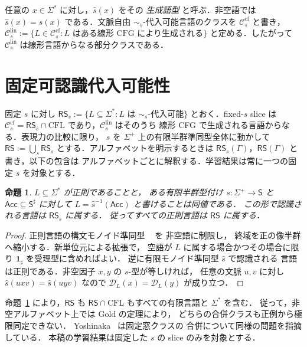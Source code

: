 \documentclass[11pt,a4paper]{ltjsarticle}
\newtheorem{proposition}[theorem]{命題}
\theoremstyle{remark}
\theoremstyle{plain}
\newcommand{\D}{\mathcal{D}}
\newcommand{\cf}{\mathrm{cf}}
\newcommand{\lin}{\mathrm{lin}}
\newcommand{\Ccf}[1]{\mathcal C_{#1}^{\cf}}
\newcommand{\Clin}[1]{\mathcal C_{#1}^{\lin}}
\begin{document}
任意の $x\in\Sigma^*$ に対し，$\widehat s(x)$ をその \emph{生成語型} と呼ぶ．非空語では $\widehat s(x)=s(x)$ である．文脈自由 $\sim_s$-代入可能言語のクラスを $\Ccf{s}$ と書き，
$\Clin{s}:=\{L\in\Ccf{s}:L\text{ はある線形 CFG により生成される}\}$
と定める．したがって $\Clin{s}$ は線形言語からなる部分クラスである．

\section{固定可認識代入可能性}
\label{sec:framework}

固定 $s$ に対し
$\mathsf{RS}_s:=\{L\subseteq\Sigma^*:L\text{ は $\sim_s$-代入可能}\}$
とおく．fixed-$s$ slice は
$\Ccf{s}=\mathsf{RS}_s\cap\mathrm{CFL}$ であり，$\Clin{s}$ はそのうち
線形 CFG で生成される言語からなる．表現力の比較に限り，
$s$ を $\Sigma^+$ 上の有限半群準同型全体に動かして
$\mathsf{RS}:=\bigcup_s\mathsf{RS}_s$ とする．アルファベットを明示するときは
$\mathsf{RS}_s(\Gamma)$，$\mathsf{RS}(\Gamma)$ と書き，以下の包含は
アルファベットごとに解釈する．学習結果は常に一つの固定 $s$ を対象とする．

\begin{proposition}\label{prop:regular-auto}
$L\subseteq\Sigma^*$ が正則であることと，
ある有限半群型付け $s:\Sigma^+\to\mathsf S$ と
$\mathsf{Acc}\subseteq\mathsf S^\sharp$ に対して
$L=\widehat s^{-1}(\mathsf{Acc})$ と書けることは同値である．
この形で認識される言語は $\mathsf{RS}_s$ に属する．
従ってすべての正則言語は $\mathsf{RS}$ に属する．
\end{proposition}
\begin{proof}
正則言語の構文モノイド準同型
~\cite[Chapter~III, Proposition~10.2]{eilenberg1974} を
非空語に制限し，
終域を正の像半群へ縮小する．新単位元による拡張で，
空語が $L$ に属する場合かつその場合に限り
$\mathbf{1}_{\sharp}$ を受理型に含めればよい．
逆に有限モノイド準同型 $\widehat s$ で認識される
言語は正則である．非空因子 $x,y$ の $s$-型が等しければ，
任意の文脈 $u,v$ に対し
$\widehat s(uxv)=\widehat s(uyv)$ なので
$\D_L(x)=\D_L(y)$ が成り立つ．
\end{proof}

命題~\ref{prop:regular-auto} により，$\mathsf{RS}$ も
$\mathsf{RS}\cap\mathrm{CFL}$ もすべての有限言語と $\Sigma^*$ を含む．
従って，非空アルファベット上では Gold の定理により，
どちらの合併クラスも正例から極限同定できない．
Yoshinaka~\cite[Section~4]{yoshinaka2008} は固定窓クラスの
合併について同様の問題を指摘している．
本稿の学習結果は固定した $s$ の slice のみを対象とする．
\end{document}

